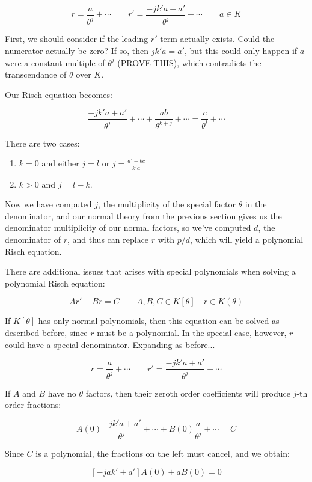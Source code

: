 $$r = \frac{a}{\theta^j} + \cdots  \qquad  r' = \frac{-j k' a + a'}{\theta^{j}} + \cdots \qquad a \in K$$

First, we should consider if the leading $r'$ term actually exists.
Could the numerator actually be zero?  If so, then $j k' a = a'$,
but this could only happen if $a$ were a constant
multiple of $\theta^j$ (PROVE THIS), which contradicts the
transcendance of $\theta$ over $K$.

Our Risch equation becomes:

$$\frac{-j k' a + a'}{\theta^{j}} + \cdots + \frac{a b }{\theta^{k+j}} + \cdots
= \frac{c}{\theta^l} + \cdots$$

There are two cases:

\begin{enumerate}
\item $k=0$ and either $j=l$ or
$j = \frac{a' + b c}{k' a}$
\item $k>0$ and $j=l-k$.
\end{enumerate}

Now we have computed $j$, the multiplicity of the special factor
$\theta$ in the
denominator, and our normal theory from the previous section gives us
the denominator multiplicity of our normal factors, so
we've computed $d$, the denominator of $r$, and
thus can replace $r$ with $p/d$, which will
yield a polynomial Risch equation.

There are additional issues that arises with special polynomials when
solving a polynomial Risch equation:

$$A r' + B r = C \qquad A,B,C \in K[\theta] \quad r \in K(\theta)$$

If $K[\theta]$ has only normal polynomials, then this equation can be
solved as described before, since $r$ must be a polynomial.
In the special case, however, $r$ could have a special denominator.
Expanding as before...

$$r = \frac{a}{\theta^j} + \cdots  \qquad  r' = \frac{-j k' a + a'}{\theta^{j}} + \cdots$$

If $A$ and $B$ have no $\theta$ factors, then their zeroth order coefficients will produce $j$-th order fractions:

$$ A(0) \frac{-j k' a + a'}{\theta^{j}} + \cdots
+ B(0) \frac{a}{\theta^j} + \cdots  = C$$

Since $C$ is a polynomial, the fractions on the left must cancel, and we obtain:

$$\left[ -j a k' + a' \right] A(0) + a B(0) = 0$$


